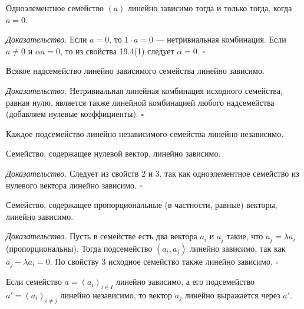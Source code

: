 \documentclass[a4paper,12pt]{article}
\theoremstyle{definition}
\theoremstyle{plain}
\theoremstyle{remark}
\begin{document}
	\begin{tcolorbox}[colback=yellow!5, colframe=orange!50!black, title=Свойство 2]
		Одноэлементное семейство \( (a) \) линейно зависимо тогда и только тогда, когда \( a = 0 \).
	\end{tcolorbox}
	
	\medskip
	\textit{Доказательство.}
	Если \( a = 0 \), то \( 1 \cdot a = 0 \) — нетривиальная комбинация. Если \( a \neq 0 \) и \( \alpha a = 0 \), то из свойства 19.4(1) следует \( \alpha = 0 \). \hfill \(\square\)
	
	\begin{tcolorbox}[colback=yellow!5, colframe=orange!50!black, title=Свойство 3]
		Всякое надсемейство линейно зависимого семейства линейно зависимо.
	\end{tcolorbox}
	
	\medskip
	\textit{Доказательство.}
	Нетривиальная линейная комбинация исходного семейства, равная нулю, является также линейной комбинацией любого надсемейства (добавляем нулевые коэффициенты). \hfill \(\square\)
	
	\begin{tcolorbox}[colback=yellow!5, colframe=orange!50!black, title=Свойство 3']
		Каждое подсемейство линейно независимого семейства линейно независимо.
	\end{tcolorbox}
	
	\begin{tcolorbox}[colback=yellow!5, colframe=orange!50!black, title=Свойство 4]
		Семейство, содержащее нулевой вектор, линейно зависимо.
	\end{tcolorbox}
	
	\medskip
	\textit{Доказательство.}
	Следует из свойств 2 и 3, так как одноэлементное семейство из нулевого вектора линейно зависимо. \hfill \(\square\)
	
	\begin{tcolorbox}[colback=yellow!5, colframe=orange!50!black, title=Свойство 5]
		Семейство, содержащее пропорциональные (в частности, равные) векторы, линейно зависимо.
	\end{tcolorbox}
	
	\medskip
	\textit{Доказательство.}
	Пусть в семействе есть два вектора \( a_i \) и \( a_j \) такие, что \( a_j = \lambda a_i \) (пропорциональны). Тогда подсемейство \( (a_i, a_j) \) линейно зависимо, так как \( a_j - \lambda a_i = 0 \). По свойству 3 исходное семейство также линейно зависимо. \hfill \(\square\)
	
	\begin{tcolorbox}[colback=yellow!5, colframe=orange!50!black, title=Свойство 6]
		Если семейство \( a = (a_i)_{i \in I} \) линейно зависимо, а его подсемейство \( a' = (a_i)_{i \neq j} \) линейно независимо, то вектор \( a_j \) линейно выражается через \( a' \).
	\end{tcolorbox}
	
\end{document}
